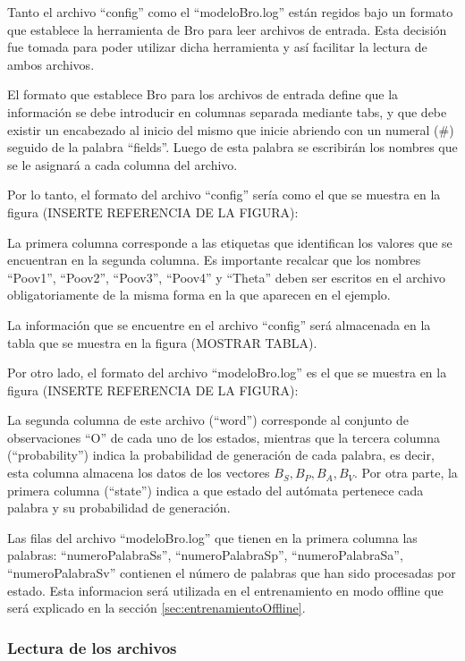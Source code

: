 Tanto el archivo “config” como el “modeloBro.log” están regidos bajo un formato que establece la herramienta de Bro para leer archivos de entrada. Esta decisión fue tomada para poder utilizar dicha herramienta y así facilitar la lectura de ambos archivos.

El formato que establece Bro para los archivos de entrada define que la información se debe introducir en columnas separada mediante tabs, y que debe existir un encabezado al inicio del mismo que inicie abriendo con un numeral (\#) seguido de la palabra “fields”. Luego de esta palabra se escribirán los nombres que se le asignará a cada columna del archivo.

Por lo tanto, el formato del archivo “config” sería como el que se muestra en la figura (INSERTE REFERENCIA DE LA FIGURA):

La primera columna corresponde a las etiquetas que identifican los valores que se encuentran en la segunda columna. Es importante recalcar que los nombres “Poov1”, “Poov2”, “Poov3”, “Poov4” y “Theta” deben ser escritos en el archivo obligatoriamente de la misma forma en la que aparecen en el ejemplo.

La información que se encuentre en el archivo “config” será almacenada
en la tabla que se muestra en la figura (MOSTRAR TABLA).

Por otro lado, el formato del archivo “modeloBro.log” es el que se muestra en la figura (INSERTE REFERENCIA DE LA FIGURA):

La segunda columna de este archivo (“word”) corresponde al conjunto de observaciones “O” de cada uno de los estados, mientras que la tercera columna (“probability”) indica la probabilidad de generación de cada palabra, es decir, esta columna almacena los datos de los vectores $B_{S}, B_{P}, B_{A}, B_{V}$. Por otra parte, la primera columna (“state”) indica a que estado del autómata pertenece cada palabra y su probabilidad de generación.

Las filas del archivo “modeloBro.log” que tienen en la primera columna las palabras:       “numeroPalabraSs”, “numeroPalabraSp”, “numeroPalabraSa”, “numeroPalabraSv” contienen el número de palabras que han sido procesadas por estado. Esta informacion será utilizada en el entrenamiento en modo offline que será explicado en la sección \ref{sec:entrenamientoOffline}.



\subsubsection*{Lectura de los archivos}

